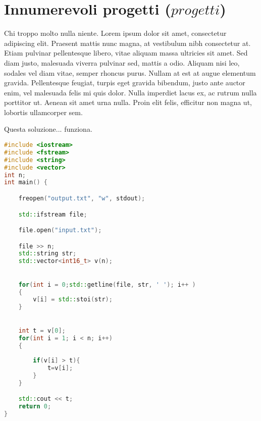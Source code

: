 \documentclass[10pt]{article}
\begin{document}
\section*{Innumerevoli progetti ($progetti$)}
Chi troppo molto nulla niente.
Lorem ipsum dolor sit amet, consectetur adipiscing elit. Praesent mattis nunc magna, at vestibulum nibh consectetur at. Etiam pulvinar pellentesque libero, vitae aliquam massa ultricies sit amet. Sed diam justo, malesuada viverra pulvinar sed, mattis a odio. Aliquam nisi leo, sodales vel diam vitae, semper rhoncus purus. Nullam at est at augue elementum gravida. Pellentesque feugiat, turpis eget gravida bibendum, justo ante auctor enim, vel malesuada felis mi quis dolor. Nulla imperdiet lacus ex, ac rutrum nulla porttitor ut. Aenean sit amet urna nulla. Proin elit felis, efficitur non magna ut, lobortis ullamcorper sem. 


\begin{tcolorbox}[colback=lightlightblue,colframe=lightblue, title=Soluzione in $\mathcal{O}(N^4)$, coltitle=black ]
    Questa soluzione... funziona.
\end{tcolorbox}

\begin{lstlisting}[language=c++]
#include <iostream>
#include <fstream>
#include <string>
#include <vector>
int n;
int main() {

  	freopen("output.txt", "w", stdout);

    std::ifstream file;

    file.open("input.txt");

    file >> n;
    std::string str;
    std::vector<int16_t> v(n);
    

    for(int i = 0;std::getline(file, str, ' '); i++ )
    {
        v[i] = std::stoi(str);
    }
    

    int t = v[0];
    for(int i = 1; i < n; i++)
    {
    	
    	if(v[i] > t){
    		t=v[i];
		}
	}

    std::cout << t;
    return 0;
}
\end{lstlisting}
\end{document}
